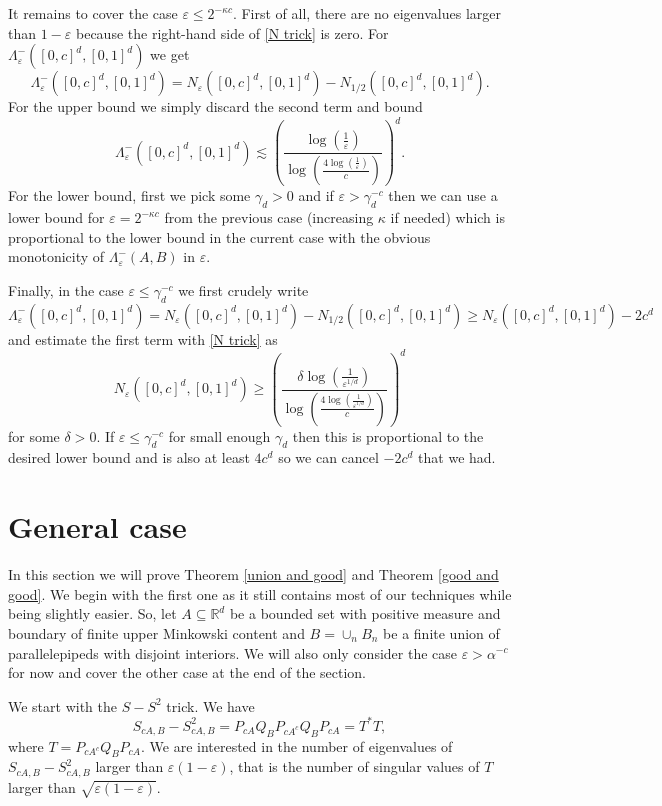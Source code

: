\documentclass[12pt]{amsart}
\numberwithin{equation}{section}
\newcommand{\R}{\mathbb{R}}
\newcommand{\eps}{\varepsilon}
\begin{document}
It remains to cover the case $\eps \le 2^{-\kappa c}$. First of all, there are no eigenvalues larger than $1-\eps$ because the right-hand side of \eqref{N trick} is zero. For $\Lambda^-_\eps([0,c]^d,[0,1]^d)$ we get
$$\Lambda^-_\eps([0,c]^d,[0,1]^d) =N_\eps([0,c]^d,[0,1]^d)- N_{1/2}([0,c]^d,[0,1]^d).$$
For the upper bound we simply discard the second term and bound 
$$\Lambda^-_\eps([0,c]^d,[0,1]^d) \lesssim \left(\frac{\log\left(\frac{1}{\eps}\right)}{\log\left(\frac{4\log\left(\frac{1}{\eps}\right)}{c}\right)}\right)^d.$$
For the lower bound, first we pick some $\gamma_d > 0$ and if $\eps > \gamma_d^{-c}$ then we can use a lower bound for $\eps = 2^{-\kappa c}$ from the previous case (increasing $\kappa$ if needed) which is proportional to the lower bound in the current case with the obvious monotonicity of $\Lambda_\eps^-(A,B)$ in $\eps$.

Finally, in the case $\eps \le \gamma_d^{-c}$ we first crudely write 
$$\Lambda^-_\eps([0,c]^d,[0,1]^d) =N_\eps([0,c]^d,[0,1]^d)- N_{1/2}([0,c]^d,[0,1]^d) \ge N_\eps([0,c]^d,[0,1]^d)-2c^d$$
and estimate the first term with \eqref{N trick} as
$$N_\eps([0,c]^d,[0,1]^d) \ge \left( \frac{\delta\log\left(\frac{1}{\eps^{1/d}}\right)}{\log\left(\frac{4\log\left(\frac{1}{\eps^{1/d}}\right)}{c}\right)}\right)^d$$
for some $\delta > 0$. If $\eps \le \gamma_d^{-c}$ for small enough $\gamma_d$ then this is proportional to the desired lower bound and is also at least $4 c^d$ so we can cancel $-2c^d$ that we had.


\section{General case}
In this section we will prove Theorem \ref{union and good} and Theorem \ref{good and good}. We begin with the first one as it still contains most of our techniques while being slightly easier. So, let $A\subseteq \R^d$ be a bounded set with positive measure and boundary of finite upper Minkowski content and $B = \cup_n B_n$ be a finite union of parallelepipeds with disjoint interiors. We will also only consider the case $\eps > \alpha^{-c}$ for now and cover the other case at the end of the section.

We start with the $S-S^2$ trick. We have
$$S_{cA,B}-S_{cA,B}^2 = P_{cA}Q_BP_{c A^c}Q_BP_{cA} = T^* T,$$
where $T =P_{cA^c}Q_BP_{cA}$. We are interested in the number of eigenvalues of $S_{cA,B}-S_{cA,B}^2$ larger than $\eps(1-\eps)$, that is the number of singular values of $T$ larger than $\sqrt{\eps(1-\eps)}$. 
\end{document}
